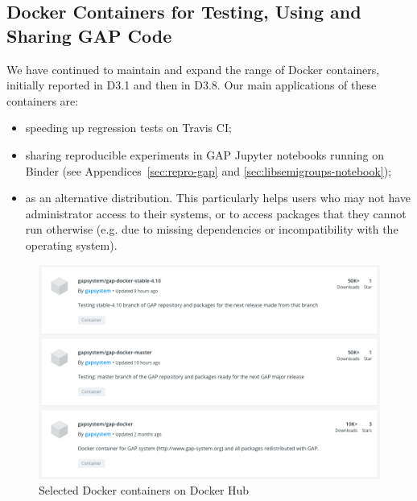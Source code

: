 %
%


\subsection{Docker Containers for Testing, Using and Sharing GAP Code}\label{docker}

We have continued to maintain and expand the range of Docker containers,
initially reported in D3.1 and then in D3.8. Our main applications of
these containers are:
\begin{itemize}
\item speeding up regression tests on Travis CI;
\item sharing reproducible experiments in GAP Jupyter notebooks running on
  Binder (see Appendices~\ref{sec:repro-gap} and
  \ref{sec:libsemigroups-notebook});
\item as an alternative distribution.
This particularly helps users who may not have administrator access
  to their systems, or to access packages that they cannot run otherwise
  (e.g. due to missing dependencies or incompatibility with the operating system).
\end{itemize}

\begin{figure}[!ht]
    \centering
    \includegraphics[width=12cm]{images/gap-docker}
    \caption{Selected \GAP Docker containers on Docker Hub}
    \label{fig:gap-docker}
\end{figure}
 
